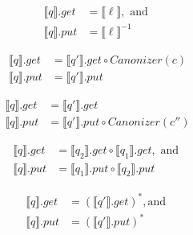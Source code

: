 \documentclass{svproc}
\newcommand{\canonizer}{\ensuremath{\mathit{Canonizer}}}
\begin{document}
 \begin{figure}[t]
  \centering
  \begin{prooftree}
\end{prooftree}
  \begin{align*}
  \llbracket q \rrbracket.get &=  \llbracket \ell \rrbracket, \text{ and }\\
  \llbracket q \rrbracket.put &= \llbracket \ell \rrbracket^{-1}
  \end{align*}
 
\begin{prooftree}
\end{prooftree}
  \begin{align*}
  \llbracket q \rrbracket.get  &= \llbracket q'
  \rrbracket.get \circ \canonizer(c)\\
  \llbracket q \rrbracket.put &= \llbracket q' \rrbracket.put
  \end{align*}

  \begin{prooftree}
  
\end{prooftree}
  \begin{align*}
  \llbracket q \rrbracket.get &= \llbracket q'
  \rrbracket.get\\
  \llbracket q \rrbracket.put &= \llbracket q'
  \rrbracket.put \circ \canonizer(c'')
  \end{align*}
  
  \begin{prooftree}
\end{prooftree}
  \begin{align*}
  \llbracket q \rrbracket.get &= \llbracket q_2 \rrbracket.get\circ \llbracket
  q_1 \rrbracket.get, \text{ and }\\
  \llbracket q \rrbracket.put &= \llbracket q_1 \rrbracket.put \circ \llbracket
  q_2 \rrbracket.put
  \end{align*}

    \begin{prooftree}
\end{prooftree}
  \begin{align*}
  \llbracket q \rrbracket.get &= (\llbracket q' \rrbracket.get)^*, \text{
  and }\\
  \llbracket q \rrbracket.put &= (\llbracket q' \rrbracket.put)^*
  \end{align*}


\end{figure}
\end{document}
